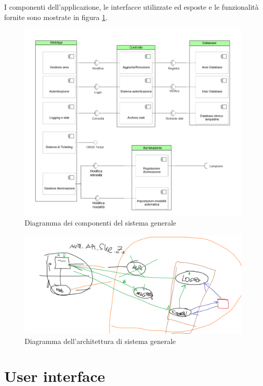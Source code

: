 I componenti dell'applicazione, le interfacce utilizzate ed esposte e le funzionalità fornite sono mostrate in figura \ref{fig:componenti_generali}.

\begin{figure}[ht]
    \centering
    \includegraphics[width=\textwidth]{img/componenti_generali.png}
    \caption{Diagramma dei componenti del sistema generale}
    \label{fig:componenti_generali}
\end{figure}

\begin{figure}[ht]
    \centering
    \includegraphics[width=\textwidth]{img/architettura_generale.png}
    \caption{Diagramma dell'architettura di sistema generale}
    \label{fig:architettura_generale}
\end{figure}

\section{User interface}

